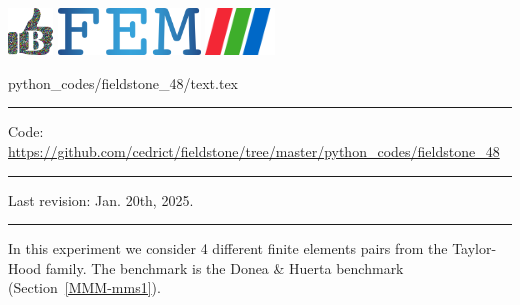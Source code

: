 \noindent
\includegraphics[height=1.25cm]{images/pictograms/benchmark}
\includegraphics[height=1.25cm]{images/pictograms/FEM}
\includegraphics[height=1.25cm]{images/pictograms/paraview}


\begin{flushright} {\tiny {\color{gray} python\_codes/fieldstone\_48/text.tex}} \end{flushright}

%

\par\noindent\rule{\textwidth}{0.4pt}

\begin{center}
\inpython
{\small Code: \url{https://github.com/cedrict/fieldstone/tree/master/python_codes/fieldstone_48}}
\end{center}

\par\noindent\rule{\textwidth}{0.4pt}

Last revision: Jan. 20th, 2025.

\par\noindent\rule{\textwidth}{0.4pt}


In this experiment we consider 4 different finite elements pairs from the 
Taylor-Hood family. 
The benchmark is the Donea \& Huerta benchmark (Section~\ref{MMM-mms1}).

